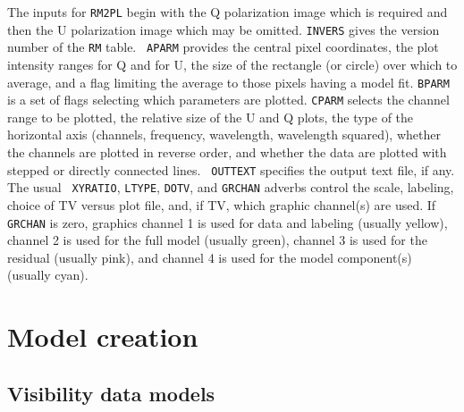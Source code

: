\documentclass[twoside]{article}
\newcommand{\hblack}{\color{black}}
\begin{document}
The inputs for {\tt RM2PL} begin with the Q polarization image which
is required and then the U polarization image which may be omitted.
{\tt INVERS} gives the version number of the {\tt RM} table.  {\tt
  APARM} provides the central pixel coordinates, the plot intensity
ranges for Q and for U, the size of the rectangle (or circle) over
which to average, and a flag limiting the average to those pixels
having a model fit.  {\tt BPARM} is a set of flags selecting which
parameters are plotted.  {\tt CPARM} selects the channel range to be
plotted, the relative size of the U and Q plots, the type of the
horizontal axis (channels, frequency, wavelength, wavelength squared),
whether the channels are plotted in reverse order, and whether the
data are plotted with stepped or directly connected lines.  {\tt
  OUTTEXT} specifies the output text file, if any.  The usual {\tt
  XYRATIO}, {\tt LTYPE}, {\tt DOTV}, and {\tt   GRCHAN} adverbs
control the scale, labeling, choice of TV versus plot file, and, if
TV, which graphic channel(s) are used.  If {\tt GRCHAN} is zero,
graphics channel 1 is used for data and labeling (usually yellow),
channel 2 is used for the full model (usually green), channel 3 is
used for the residual (usually pink), and channel 4 is used for the
model component(s) (usually cyan).

\hblack
\section{Model creation}

\subsection{Visibility data models}
\end{document}
